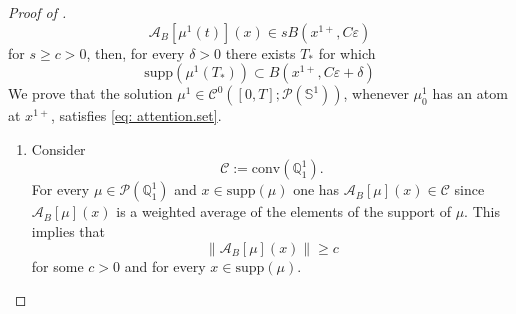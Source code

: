 \documentclass[a4paper,11pt]{article}
\theoremstyle{plain}
\newcommand{\supp}{\mathrm{supp}}
\newcommand{\bB}{\bm{\mathit{B}}}
\newcommand{\Q}{\mathbb{Q}}
\renewcommand{\geq}{\geqslant}
\numberwithin{equation}{section}
\begin{document}
\begin{proof}[Proof of ]
\begin{equation}\label{eq: attention.set}
    \mathscr{A}_{\bB}[\mu^1(t)](x)\in sB(x^{1+},C\varepsilon)
\end{equation}
for $s\geq c>0$, then, for every $\delta>0$ there exists $T_*$ for which
\begin{equation*}
    \supp\left(\mu^1(T_*)\right)\subset B(x^{1+},C\varepsilon+\delta)
\end{equation*}
We prove that the solution $\mu^1\in \mathscr{C}^0([0,T];\mathscr{P}(\mathbb{S}^1))$, whenever $\mu_0^1$ has an atom at $x^{1+}$, satisfies \eqref{eq: attention.set}. 
\begin{enumerate}
    \item Consider
    $$\mathscr{C}:=\mathrm{conv }(\Q_1^1).$$ 
For every $\mu\in\mathscr{P}(\Q_1^1)$ and $x\in\mathrm{supp}(\mu)$ one has
$\mathscr{A}_{\bB}[\mu](x)\in\mathscr{C}$ since $\mathscr{A}_{\bB}[\mu](x)$ is a weighted average of the elements of the support of $\mu$. This implies that 
\begin{equation}\label{eq: low.bound.attention}
    \|\mathscr{A}_{\bB}[\mu](x)\|\geq c
\end{equation}
for some $c>0$ and for every $x\in\supp(\mu)$. 


\end{enumerate}
\end{proof}
\end{document}
